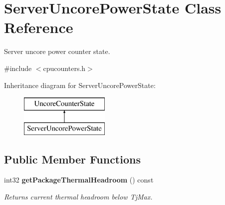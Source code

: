 \section{Server\+Uncore\+Power\+State Class Reference}
\label{classServerUncorePowerState}


Server uncore power counter state.  




{\ttfamily \#include $<$cpucounters.\+h$>$}

Inheritance diagram for Server\+Uncore\+Power\+State\+:\begin{figure}[H]
\begin{center}
\leavevmode
\includegraphics[height=2.000000cm]{classServerUncorePowerState}
\end{center}
\end{figure}
\subsection*{Public Member Functions}
\begin{DoxyCompactItemize}
\item 
int32 {\bf get\+Package\+Thermal\+Headroom} () const \label{classServerUncorePowerState_a2680b28b8d92da4cf74a3a1c59bf7c1d}

\begin{DoxyCompactList}\small\item\em Returns current thermal headroom below Tj\+Max. \end{DoxyCompactList}\end{DoxyCompactItemize}
